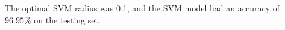 \begin{answer}
    The optimal SVM radius was 0.1, and the SVM model had an accuracy of $96.95\%$ on the testing set.
\end{answer}
